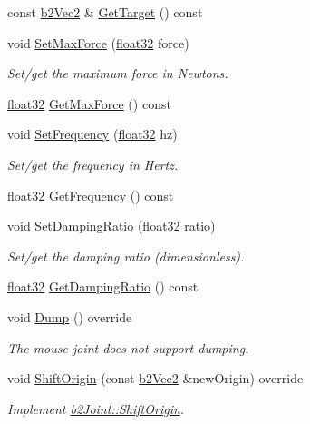 \begin{DoxyCompactItemize}
const \mbox{\hyperlink{structb2_vec2}{b2\+Vec2}} \& \mbox{\hyperlink{classb2_mouse_joint_a9904bbdf5b73f49954f37c27c983d715}{Get\+Target}} () const
\item 
void \mbox{\hyperlink{classb2_mouse_joint_a4beba6ea0827960fac2474563591c03a}{Set\+Max\+Force}} (\mbox{\hyperlink{b2_settings_8h_aacdc525d6f7bddb3ae95d5c311bd06a1}{float32}} force)
\begin{DoxyCompactList}\small\item\em Set/get the maximum force in Newtons. \end{DoxyCompactList}\item 
\mbox{\hyperlink{b2_settings_8h_aacdc525d6f7bddb3ae95d5c311bd06a1}{float32}} \mbox{\hyperlink{classb2_mouse_joint_a61c9fbd78498d3484f824876654eb015}{Get\+Max\+Force}} () const
\item 
void \mbox{\hyperlink{classb2_mouse_joint_a8b37706535923637ca280c5a0467b14d}{Set\+Frequency}} (\mbox{\hyperlink{b2_settings_8h_aacdc525d6f7bddb3ae95d5c311bd06a1}{float32}} hz)
\begin{DoxyCompactList}\small\item\em Set/get the frequency in Hertz. \end{DoxyCompactList}\item 
\mbox{\hyperlink{b2_settings_8h_aacdc525d6f7bddb3ae95d5c311bd06a1}{float32}} \mbox{\hyperlink{classb2_mouse_joint_a97b9264cc357ac96e447990f52086719}{Get\+Frequency}} () const
\item 
void \mbox{\hyperlink{classb2_mouse_joint_a648c8f3ecb82f4887c0eefcfe48cbd37}{Set\+Damping\+Ratio}} (\mbox{\hyperlink{b2_settings_8h_aacdc525d6f7bddb3ae95d5c311bd06a1}{float32}} ratio)
\begin{DoxyCompactList}\small\item\em Set/get the damping ratio (dimensionless). \end{DoxyCompactList}\item 
\mbox{\hyperlink{b2_settings_8h_aacdc525d6f7bddb3ae95d5c311bd06a1}{float32}} \mbox{\hyperlink{classb2_mouse_joint_a551de1d56a743e71684a1382054c17c9}{Get\+Damping\+Ratio}} () const
\item 
void \mbox{\hyperlink{classb2_mouse_joint_aea1ff1e5b71ba5630875585cab1e2a96}{Dump}} () override
\begin{DoxyCompactList}\small\item\em The mouse joint does not support dumping. \end{DoxyCompactList}\item 
void \mbox{\hyperlink{classb2_mouse_joint_a9b1b2671837495be175e496afb622904}{Shift\+Origin}} (const \mbox{\hyperlink{structb2_vec2}{b2\+Vec2}} \&new\+Origin) override
\begin{DoxyCompactList}\small\item\em Implement \mbox{\hyperlink{classb2_joint_a7804f649e993dc0fd9ae47fde5601f90}{b2\+Joint\+::\+Shift\+Origin}}. \end{DoxyCompactList}\end{DoxyCompactItemize}
